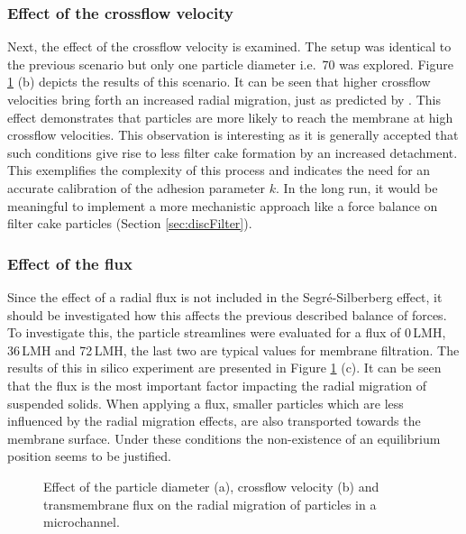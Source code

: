 \subsubsection{Effect of the crossflow velocity}
Next, the effect of the crossflow velocity is examined. The setup was identical to the previous scenario but only one particle diameter i.e.\ \unit{70}{\micro\metre} was explored. Figure \ref{fig:effect} (b) depicts the results of this scenario. It can be seen that higher crossflow velocities bring forth an increased radial migration, just as predicted by \cite{Matas2004}. This effect demonstrates that particles are more likely to reach the membrane at high crossflow velocities. This observation is interesting as it is generally accepted that such conditions give rise to less filter cake formation by an increased detachment. This exemplifies the complexity of this process and indicates the need for an accurate calibration of the adhesion parameter $k$. In the long run, it would be meaningful to implement a more mechanistic approach like a force balance on filter cake particles (Section \ref{sec:discFilter}).

\subsubsection{Effect of the flux}
Since the effect of a radial flux is not included in the Segr\'e-Silberberg effect, it should be investigated how this affects the previous described balance of forces. To investigate this, the particle streamlines were evaluated for a flux of 0\,LMH, 36\,LMH and 72\,LMH, the last two are typical values for membrane filtration. The results of this in silico experiment are presented in Figure \ref{fig:effect} (c). It can be seen that the flux is the most important factor impacting  the radial migration of suspended solids. When applying a flux, smaller particles which are less influenced by the radial migration effects, are also transported towards the membrane surface. Under these conditions the non-existence of an equilibrium position seems to be justified.
\begin{figure}[H]
 \centerline{
 }
 \centerline{
 }
 \centerline{
 }
 \caption{Effect of the particle diameter (a), crossflow velocity (b) and transmembrane flux on the radial migration of particles in a microchannel.} \label{fig:effect} 
\end{figure}

